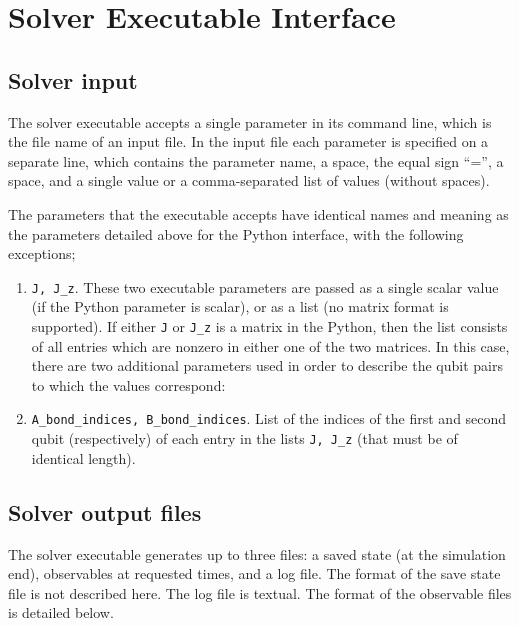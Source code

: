 \documentclass[aps,10pt,pra,twocolumn,groupedaddress,floatfix,superscriptaddress,showpacs,showkeys,amsfonts]{revtex4-2}
\begin{document}
\section{Solver Executable Interface}\label{Sec:CppInterface}

\subsection{Solver input}

The solver executable accepts a single parameter in its command line, which is the file name of an input file.
In the input file each parameter is specified on a separate line, which contains the parameter name, a space, the equal sign ``='', a space, and a single value or a comma-separated list of values (without spaces).

The parameters that the executable accepts have identical names and meaning as the parameters detailed above for the Python interface, with the following exceptions;
\begin{enumerate} 
\item \verb|J, J_z|. These two executable parameters are passed as a single scalar value (if the Python parameter is scalar), or as a list (no matrix format is supported). If either \verb|J| or \verb|J_z| is a matrix in the Python, then the list consists of all entries which are nonzero in either one of the two matrices. In this case, there are two additional parameters used in order to describe the qubit pairs to which the values correspond:
\item \verb|A_bond_indices, B_bond_indices|. List of the indices of the first and second qubit (respectively) of each entry in the lists \verb|J, J_z| (that must be of identical length).
\end{enumerate}

\subsection{Solver output files}


The solver executable generates up to three files: a saved state (at the simulation end), observables at requested times, and a log file.
The format of the save state file is not described here. The log file is textual. The format of the observable files is detailed below.
\end{document}
